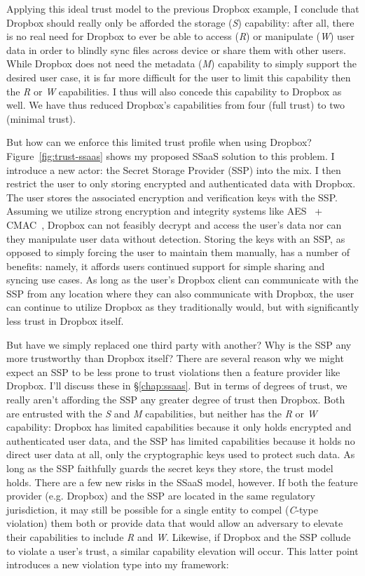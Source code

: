 Applying this ideal trust model to the previous Dropbox example, I
conclude that Dropbox should really only be afforded the storage
(\emph{S}) capability: after all, there is no real need for Dropbox to
ever be able to access (\emph{R}) or manipulate (\emph{W}) user data
in order to blindly sync files across device or share them with other
users. While Dropbox does not need the metadata (\emph{M}) capability
to simply support the desired user case, it is far more difficult for
the user to limit this capability then the \emph{R} or \emph{W}
capabilities. I thus will also concede this capability to Dropbox as
well. We have thus reduced Dropbox's capabilities from four (full
trust) to two (minimal trust).

But how can we enforce this limited trust profile when using Dropbox?
Figure~\ref{fig:trust-ssaas} shows my proposed SSaaS solution to this
problem. I introduce a new actor: the Secret Storage Provider (SSP)
into the mix. I then restrict the user to only storing encrypted and
authenticated data with Dropbox. The user stores the associated
encryption and verification keys with the SSP. Assuming we utilize
strong encryption and integrity systems like AES~\cite{nist2001} +
CMAC~\cite{dworkin2005}, Dropbox can not feasibly decrypt and access
the user's data nor can they manipulate user data without
detection. Storing the keys with an SSP, as opposed to simply forcing
the user to maintain them manually, has a number of benefits: namely,
it affords users continued support for simple sharing and syncing use
cases. As long as the user's Dropbox client can communicate with the
SSP from any location where they can also communicate with Dropbox,
the user can continue to utilize Dropbox as they traditionally would,
but with significantly less trust in Dropbox itself.

But have we simply replaced one third party with another? Why is the
SSP any more trustworthy than Dropbox itself? There are several reason
why we might expect an SSP to be less prone to trust violations then a
feature provider like Dropbox. I'll discuss these in
\S\ref{chap:ssaas}. But in terms of degrees of trust, we really aren't
affording the SSP any greater degree of trust then Dropbox. Both are
entrusted with the \emph{S} and \emph{M} capabilities, but neither has
the \emph{R} or \emph{W} capability: Dropbox has limited capabilities
because it only holds encrypted and authenticated user data, and the
SSP has limited capabilities because it holds no direct user data at
all, only the cryptographic keys used to protect such data. As long as
the SSP faithfully guards the secret keys they store, the trust model
holds. There are a few new risks in the SSaaS model, however. If both
the feature provider (e.g. Dropbox) and the SSP are located in the
same regulatory jurisdiction, it may still be possible for a single
entity to compel (\emph{C}-type violation) them both or provide data
that would allow an adversary to elevate their capabilities to include
\emph{R} and \emph{W}. Likewise, if Dropbox and the SSP collude to
violate a user's trust, a similar capability elevation will
occur. This latter point introduces a new violation type into my
framework:

